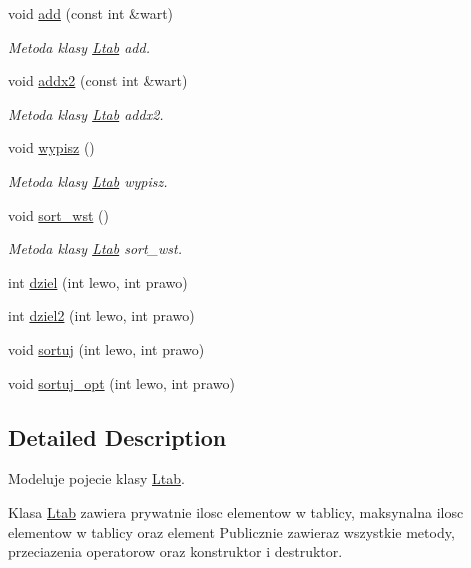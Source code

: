 \begin{DoxyCompactItemize}
void \hyperlink{class_ltab_a9d984316c3c88691e9ccfeaed884bfff}{add} (const int \&wart)
\begin{DoxyCompactList}\small\item\em Metoda klasy \hyperlink{class_ltab}{Ltab} add. \end{DoxyCompactList}\item 
void \hyperlink{class_ltab_ade764d08f90e2989bef67a652202f9f1}{addx2} (const int \&wart)
\begin{DoxyCompactList}\small\item\em Metoda klasy \hyperlink{class_ltab}{Ltab} addx2. \end{DoxyCompactList}\item 
void \hyperlink{class_ltab_a4b81c405bc3cf4b4510b0e879ec983b2}{wypisz} ()
\begin{DoxyCompactList}\small\item\em Metoda klasy \hyperlink{class_ltab}{Ltab} wypisz. \end{DoxyCompactList}\item 
void \hyperlink{class_ltab_adc068a9b92a287cdd0b57497b9859eca}{sort\-\_\-wst} ()
\begin{DoxyCompactList}\small\item\em Metoda klasy \hyperlink{class_ltab}{Ltab} sort\-\_\-wst. \end{DoxyCompactList}\item 
int \hyperlink{class_ltab_a83fcc265ec39c5a78826118e86aaddc2}{dziel} (int lewo, int prawo)
\item 
int \hyperlink{class_ltab_aadee500f6112321d8664f3989daf37df}{dziel2} (int lewo, int prawo)
\item 
void \hyperlink{class_ltab_a3fbc0651b0d2c4592357e4028ff5a0f7}{sortuj} (int lewo, int prawo)
\item 
void \hyperlink{class_ltab_a30e46ca8cc5bada27cf3f7d2eedce4d1}{sortuj\-\_\-opt} (int lewo, int prawo)
\end{DoxyCompactItemize}


\subsection{Detailed Description}
Modeluje pojecie klasy \hyperlink{class_ltab}{Ltab}. 

Klasa \hyperlink{class_ltab}{Ltab} zawiera prywatnie ilosc elementow w tablicy, maksynalna ilosc elementow w tablicy oraz element Publicznie zawieraz wszystkie metody, przeciazenia operatorow oraz konstruktor i destruktor. 


